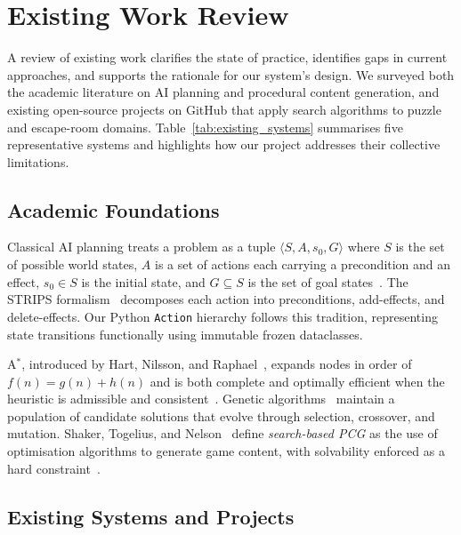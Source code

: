 \documentclass[12pt, a4paper]{report}
\begin{document}
\chapter{Existing Work Review}
\label{chap:litreview}

A review of existing work clarifies the state of practice, identifies gaps in current approaches, and supports the rationale for our system's design.  We surveyed both the academic literature on AI planning and procedural content generation, and existing open-source projects on GitHub that apply search algorithms to puzzle and escape-room domains.  Table~\ref{tab:existing_systems} summarises five representative systems and highlights how our project addresses their collective limitations.

\section{Academic Foundations}

Classical AI planning treats a problem as a tuple $\langle S, A, s_0, G \rangle$ where $S$ is the set of possible world states, $A$ is a set of actions each carrying a precondition and an effect, $s_0 \in S$ is the initial state, and $G \subseteq S$ is the set of goal states~\cite{russell2020ai}.  The STRIPS formalism~\cite{fikes1971strips} decomposes each action into preconditions, add-effects, and delete-effects.  Our Python \texttt{Action} hierarchy follows this tradition, representing state transitions functionally using immutable frozen dataclasses.

A$^{\ast}$, introduced by Hart, Nilsson, and Raphael~\cite{hart1968formal}, expands nodes in order of $f(n) = g(n) + h(n)$ and is both complete and optimally efficient when the heuristic is admissible and consistent~\cite{russell2020ai, pearl1984heuristics}.  Genetic algorithms~\cite{holland1992adaptation, goldberg1989genetic} maintain a population of candidate solutions that evolve through selection, crossover, and mutation.  Shaker, Togelius, and Nelson~\cite{shaker2016procedural} define \emph{search-based PCG} as the use of optimisation algorithms to generate game content, with solvability enforced as a hard constraint~\cite{togelius2011search}.

\section{Existing Systems and Projects}
\end{document}
